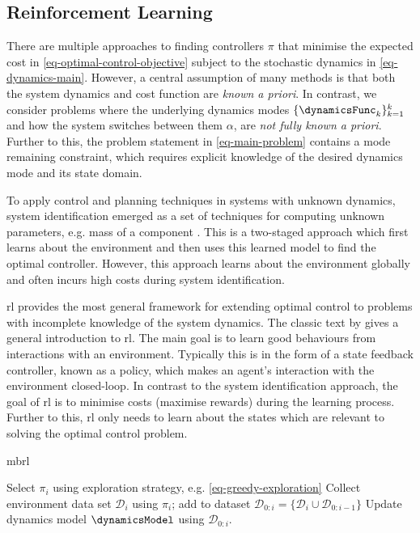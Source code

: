 \documentclass{mimosis-class/mimosis}
\numberwithin{equation}{chapter}
\newcommand{\modeInd}{\ensuremath{k}}
\newcommand{\ModeInd}{\ensuremath{\MakeUppercase{\modeInd}}}
\newcommand{\mode}[1]{\ensuremath{#1_{\modeInd}}}
\newcommand{\state}{\ensuremath{\mathbf{x}}}
\newcommand{\dataset}{\ensuremath{\mathcal{D}}}
\newcommand{\modeVar}{\ensuremath{\alpha}}
\begin{document}
\subsection{Reinforcement Learning}
\label{sec:orgb3b6803}
There are multiple approaches to finding controllers \(\pi\) that minimise the expected cost
in \cref{eq-optimal-control-objective} subject to the stochastic dynamics in \cref{eq-dynamics-main}.
However, a central assumption of many methods is that both the system dynamics and cost function are \emph{known a priori}.
In contrast, we consider problems where
the underlying dynamics modes \(\{\mode{\dynamicsFunc}\}_{\modeInd=1}^{\ModeInd}\)
and how the system switches between them \(\modeVar\), are \textit{not fully known a priori}.
Further to this, the problem statement in \cref{eq-main-problem} contains a mode remaining constraint,
which requires explicit knowledge of the desired dynamics mode and its state domain.

To apply control and planning techniques in systems with unknown dynamics,
system identification emerged as a set of techniques for computing unknown parameters, e.g. mass of a component
\citep{ljungSystem1999}.
This is a two-staged approach which first learns about the environment and then uses this
learned model to find the optimal controller.
However, this approach learns about the environment globally and often incurs high costs during system identification.

\acrfull{rl} provides the most general framework for extending optimal
control to problems with incomplete knowledge of the system dynamics.
The classic text by \cite{sutton2018reinforcement} gives a general introduction to \acrshort{rl}.
The main goal is to learn good behaviours from interactions with an environment.
Typically this is in the form of a state feedback controller, known as a policy, which makes an agent's interaction
with the environment closed-loop.
In contrast to the system identification approach,
the goal of \acrshort{rl} is to minimise costs (maximise rewards) during the learning process.
Further to this, \acrshort{rl} only needs to learn about the states which are relevant to solving
the optimal control problem.

\begin{algorithm}[!t]
\caption{\acrfull{mbrl}}\label{alg-mbrl-background}
\begin{algorithmic}[1]
\Require{Policy/controller $\policy_0$, dynamics model $\dynamicsModel$, start state $\state_0$}
    \State Select $\pi_i$ using exploration strategy, e.g. \cref{eq-greedy-exploration}
    \State Collect environment data set $\dataset_i$ using $\pi_i$; add to dataset $\dataset_{0:i} = \{\dataset_{i} \cup \dataset_{0:i-1}\}$
    \State Update dynamics model $\dynamicsModel$ using $\dataset_{0:i}$.
\EndFor
\end{algorithmic}
\end{algorithm}
\end{document}
